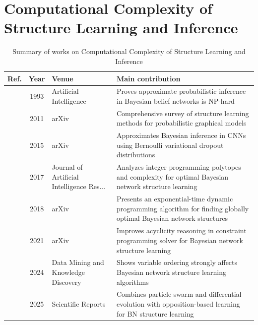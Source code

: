 \section{Computational Complexity of Structure Learning and Inference}\label{sec:theme6}
\begin{table}[!t]
\centering
\renewcommand{\arraystretch}{1.2}
\caption{Summary of works on Computational Complexity of Structure Learning and Inference}\label{tab:theme6}
\begin{tabularx}{\textwidth}{@{}l c p{3.6cm} X@{}}
\toprule
\textbf{Ref.} & \textbf{Year} & \textbf{Venue} & \textbf{Main contribution} \\
\midrule
\cite{dagum1993approximating} & 1993 & Artificial Intelligence & Proves approximate probabilistic inference in Bayesian belief networks is NP-hard \\
\cite{zhou2011structure} & 2011 & arXiv & Comprehensive survey of structure learning methods for probabilistic graphical models \\
\cite{gal2015bayesian} & 2015 & arXiv & Approximates Bayesian inference in CNNs using Bernoulli variational dropout distributions \\
\cite{cussens2017bayesian} & 2017 & Journal of Artificial Intelligence Res... & Analyzes integer programming polytopes and complexity for optimal Bayesian network structure learning \\
\cite{singh2018finding} & 2018 & arXiv & Presents an exponential-time dynamic programming algorithm for finding globally optimal Bayesian network structures \\
\cite{trosser2021improved} & 2021 & arXiv & Improves acyclicity reasoning in constraint programming solver for Bayesian network structure learning \\
\cite{kitson2024impact} & 2024 & Data Mining and Knowledge Discovery & Shows variable ordering strongly affects Bayesian network structure learning algorithms \\
\cite{sun2025bayesian} & 2025 & Scientific Reports & Combines particle swarm and differential evolution with opposition-based learning for BN structure learning \\
\bottomrule
\end{tabularx}
\end{table}

